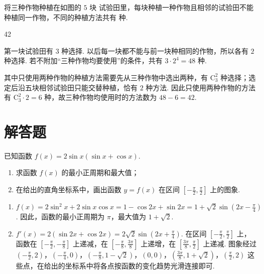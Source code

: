 \begin{problem}
将三种作物种植在如图的 \(5\text{ 块}\) 试验田里，每块种植一种作物且相邻的试验田不能种植同一作物，不同的种植方法共有\fillinblank{}\(\text{ 种}\).

\begin{center}
\end{center}
\begin{answer}
42
\end{answer}

\begin{solution}
第一块试验田有 \(3\) 种选择. 以后每一块都不能与前一块种相同的作物，所以各有 \(2\) 种选择. 若不附加“三种作物均要使用”的条件，共有 \(3\cdot2^{4}=48\) 种.

其中只使用两种作物的种植方法需要先从三种作物中选出两种，有 \(\mathrm C_{3}^{2}\) 种选择；选定后沿五块相邻试验田只能交替种植，恰有 \(2\) 种方法. 因此只使用两种作物的方法有 \(\mathrm C_{3}^{2}\cdot2=6\) 种，故三种作物均使用时的方法数为 \(48-6=42\).
\end{solution}
\end{problem}

\section{解答题}
\begin{problem}
已知函数 \( f(x)=2\sin x(\sin x+\cos x) \).

\begin{enumerate}
\item 求函数 \(f(x)\) 的最小正周期和最大值；
\item 在给出的直角坐标系中，画出函数 \(y=f(x)\) 在区间 \(\left[-\frac{\pi}{2}, \frac{\pi}{2}\right]\) 上的图象.
\end{enumerate}

\begin{center}
\end{center}

\begin{solution}
\begin{enumerate}
\item \(f(x)=2\sin^{2}x+2\sin x\cos x=1-\cos 2x+\sin 2x=1+\sqrt{2}\sin\left(2x-\frac{\pi}{4}\right)\). 因此，函数的最小正周期为 \(\pi\)，最大值为 \(1+\sqrt{2}\).
\item \(f'(x)=2\left(\sin 2x+\cos 2x\right)=2\sqrt{2}\sin\left(2x+\frac{\pi}{4}\right)\). 在区间 \(\left[-\frac{\pi}{2},\frac{\pi}{2}\right]\) 上，函数在 \(\left[-\frac{\pi}{2},-\frac{\pi}{8}\right]\) 上递减，在 \(\left[-\frac{\pi}{8},\frac{3\pi}{8}\right]\) 上递增，在 \(\left[\frac{3\pi}{8},\frac{\pi}{2}\right]\) 上递减. 图象经过 \(\left(-\frac{\pi}{2},2\right)\)，\(\left(-\frac{\pi}{4},0\right)\)，\(\left(-\frac{\pi}{8},1-\sqrt{2}\right)\)，\((0,0)\)，\(\left(\frac{3\pi}{8},1+\sqrt{2}\right)\)，\(\left(\frac{\pi}{2},2\right)\) 这些点，在给出的坐标系中将各点按函数的变化趋势光滑连接即可.
\end{enumerate}
\end{solution}
\end{problem}

